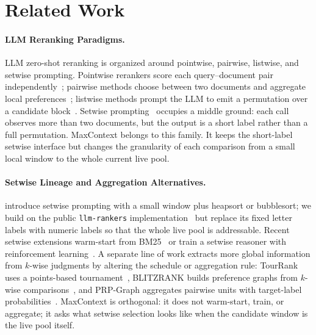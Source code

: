 \section{Related Work}
\label{sec:related-work}


\paragraph{LLM Reranking Paradigms.}
LLM zero-shot reranking is organized around pointwise, pairwise, listwise, and setwise prompting. Pointwise rerankers score each query--document pair independently~\citep{nogueira2020monot5,sachan2022upr,ma2024rankllama}; pairwise methods choose between two documents and aggregate local preferences~\citep{qin2024prp,luo2024prpgraph}; listwise methods prompt the LLM to emit a permutation over a candidate block~\citep{sun2023rankgpt,ma2023zeroshotlistwise,pradeep2023rankvicuna,pradeep2023rankzephyr,zhang2025rankwithoutgpt}. Setwise prompting~\citep{zhuang2024setwise} occupies a middle ground: each call observes more than two documents, but the output is a short label rather than a full permutation. MaxContext belongs to this family. It keeps the short-label setwise interface but changes the granularity of each comparison from a small local window to the whole current live pool.

\paragraph{Setwise Lineage and Aggregation Alternatives.}
\citet{zhuang2024setwise} introduce setwise prompting with a small window plus heapsort or bubblesort; we build on the public
\texttt{llm-rankers} implementation~\citep{ielab_llmrankers} but replace its fixed letter labels with numeric labels so that the whole live pool is addressable. Recent setwise extensions warm-start from BM25~\citep{podolak2025setwiseinsertion} or train a setwise reasoner with reinforcement learning~\citep{zhuang2025rankr1}. A separate line of work extracts more global information from $k$-wise judgments by altering the schedule or aggregation rule: TourRank uses a points-based tournament~\citep{chen2025tourrank}, BLITZRANK builds preference graphs from $k$-wise comparisons~\citep{agrawal2026blitzrank}, and PRP-Graph aggregates pairwise units with target-label probabilities~\citep{luo2024prpgraph}. MaxContext is orthogonal: it does not warm-start, train, or aggregate; it asks what setwise selection looks like when the candidate window is the live pool itself.

